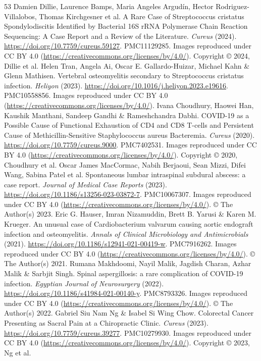 \begin{thebibliography}{53}
 Damien Dillie, Laurence Bamps, Maria Angeles Argudín, Hector Rodriguez-Villalobos, Thomas Kirchgesner et al. A Rare Case of Streptococcus cristatus Spondylodiscitis Identified by Bacterial 16S rRNA Polymerase Chain Reaction Sequencing: A Case Report and a Review of the Literature. \textit{Cureus} (2024). \url{https://doi.org/10.7759/cureus.59127}. PMC11129285. Images reproduced under CC BY 4.0 (\url{https://creativecommons.org/licenses/by/4.0/}). Copyright © 2024, Dillie et al.
 Helen Tran, Angela Ai, Oscar E. Gallardo-Huizar, Michael Kahn \& Glenn Mathisen. Vertebral osteomyelitis secondary to Streptococcus cristatus infection. \textit{Heliyon} (2023). \url{https://doi.org/10.1016/j.heliyon.2023.e19616}. PMC10558856. Images reproduced under CC BY 4.0 (\url{https://creativecommons.org/licenses/by/4.0/}).
 Ivana Choudhury, Haowei Han, Kaushik Manthani, Sandeep Gandhi \& Rameshchandra Dabhi. COVID-19 as a Possible Cause of Functional Exhaustion of CD4 and CD8 T-cells and Persistent Cause of Methicillin-Sensitive Staphylococcus aureus Bacteremia. \textit{Cureus} (2020). \url{https://doi.org/10.7759/cureus.9000}. PMC7402531. Images reproduced under CC BY 4.0 (\url{https://creativecommons.org/licenses/by/4.0/}). Copyright © 2020, Choudhury et al.
 Oscar James MacCormac, Nabih Berjaoui, Sean Mizzi, Difei Wang, Sabina Patel et al. Spontaneous lumbar intraspinal subdural abscess: a case report. \textit{Journal of Medical Case Reports} (2023). \url{https://doi.org/10.1186/s13256-023-03872-7}. PMC10067307. Images reproduced under CC BY 4.0 (\url{https://creativecommons.org/licenses/by/4.0/}). © The Author(s) 2023.
 Eric G. Hauser, Imran Nizamuddin, Brett B. Yarusi \& Karen M. Krueger. An unusual case of Cardiobacterium valvarum causing aortic endograft infection and osteomyelitis. \textit{Annals of Clinical Microbiology and Antimicrobials} (2021). \url{https://doi.org/10.1186/s12941-021-00419-w}. PMC7916262. Images reproduced under CC BY 4.0 (\url{https://creativecommons.org/licenses/by/4.0/}). © The Author(s) 2021.
 Rumana Makhdoomi, Nayil Malik, Jagdish Charan, Azhar Malik \& Sarbjit Singh. Spinal aspergillosis: a rare complication of COVID-19 infection. \textit{Egyptian Journal of Neurosurgery} (2022). \url{https://doi.org/10.1186/s41984-021-00140-y}. PMC8793326. Images reproduced under CC BY 4.0 (\url{https://creativecommons.org/licenses/by/4.0/}). © The Author(s) 2022.
 Gabriel Siu Nam Ng \& Isabel Si Wing Chow. Colorectal Cancer Presenting as Sacral Pain at a Chiropractic Clinic. \textit{Cureus} (2023). \url{https://doi.org/10.7759/cureus.39277}. PMC10279930. Images reproduced under CC BY 4.0 (\url{https://creativecommons.org/licenses/by/4.0/}). Copyright © 2023, Ng et al.

\end{thebibliography}
